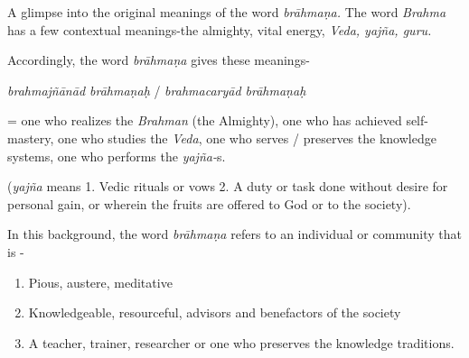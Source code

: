 A glimpse into the original meanings of the word \textit{brāhmaṇa.} The word \textit{Brahma} has a few contextual meanings-the almighty, vital energy, \textit{Veda, yajña, guru.}

Accordingly, the word \textit{brāhmaṇa} gives these meanings-

\textit{brahmajñānād brāhmaṇaḥ} / \textit{brahmacaryād brāhmaṇaḥ}

= one who realizes the \textit{Brahman} (the Almighty), one who has achieved self-mastery, one who studies the \textit{Veda}, one who serves / preserves the knowledge systems, one who performs the \textit{yajña-}s.

(\textit{yajña} means 1. Vedic rituals or vows 2. A duty or task done without desire for personal gain, or wherein the fruits are offered to God or to the society).

In this background, the word \textit{brāhmaṇa} refers to an individual or community that is -

\vspace{-.3cm}

\begin{enumerate}
\itemsep=0pt

 \item Pious, austere, meditative 

 \item Knowledgeable, resourceful, advisors and benefactors of the society 

 \item A teacher, trainer, researcher or one who preserves the knowledge traditions.

\end{enumerate}

\vspace{-.3cm}

